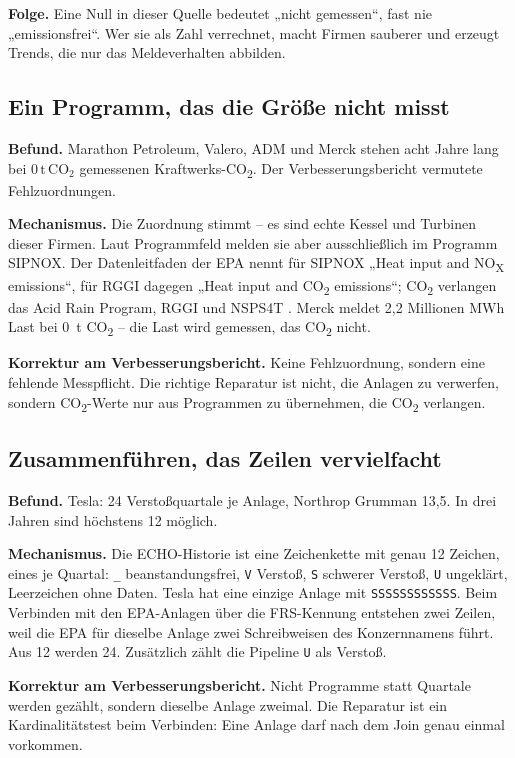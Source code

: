 \documentclass[11pt,a4paper]{article}
\newcommand{\tco}{\ensuremath{\mathrm{t\,CO}_{2}}}
\newcommand{\befund}[1]{%
  \par\vspace{2pt}\noindent\colorbox{softgrey}{%
  \begin{minipage}{\dimexpr\linewidth-2\fboxsep}\small\vspace{3pt}#1\vspace{3pt}\end{minipage}}\par\vspace{4pt}}
\begin{document}
\befund{\textbf{Folge.} Eine Null in dieser Quelle bedeutet „nicht gemessen“, fast nie „emissionsfrei“. Wer sie als Zahl verrechnet, macht Firmen sauberer und erzeugt Trends, die nur das Meldeverhalten abbilden.}

\subsection{Ein Programm, das die Größe nicht misst}

\textbf{Befund.} Marathon Petroleum, Valero, ADM und Merck stehen acht Jahre lang bei 0\,\tco{} gemessenen Kraftwerks-CO\textsubscript{2}. Der Verbesserungsbericht vermutete Fehlzuordnungen.

\textbf{Mechanismus.} Die Zuordnung stimmt -- es sind echte Kessel und Turbinen dieser Firmen. Laut Programmfeld melden sie aber ausschließlich im Programm SIPNOX. Der Datenleitfaden der EPA nennt für SIPNOX „Heat input and NO\textsubscript{X} emissions“, für RGGI dagegen „Heat input and CO\textsubscript{2} emissions“; CO\textsubscript{2} verlangen das Acid Rain Program, RGGI und NSPS4T \cite{camdguide}. Merck meldet 2{,}2 Millionen MWh Last bei 0~t CO\textsubscript{2} -- die Last wird gemessen, das CO\textsubscript{2} nicht.

\befund{\textbf{Korrektur am Verbesserungsbericht.} Keine Fehlzuordnung, sondern eine fehlende Messpflicht. Die richtige Reparatur ist nicht, die Anlagen zu verwerfen, sondern CO\textsubscript{2}-Werte nur aus Programmen zu übernehmen, die CO\textsubscript{2} verlangen.}

\subsection{Zusammenführen, das Zeilen vervielfacht}

\textbf{Befund.} Tesla: 24 Verstoßquartale je Anlage, Northrop Grumman 13{,}5. In drei Jahren sind höchstens 12 möglich.

\textbf{Mechanismus.} Die ECHO-Historie ist eine Zeichenkette mit genau 12 Zeichen, eines je Quartal: \texttt{\_} beanstandungsfrei, \texttt{V} Verstoß, \texttt{S} schwerer Verstoß, \texttt{U} ungeklärt, Leerzeichen ohne Daten. Tesla hat eine einzige Anlage mit \texttt{SSSSSSSSSSSS}. Beim Verbinden mit den EPA-Anlagen über die FRS-Kennung entstehen zwei Zeilen, weil die EPA für dieselbe Anlage zwei Schreibweisen des Konzernnamens führt. Aus 12 werden 24. Zusätzlich zählt die Pipeline \texttt{U} als Verstoß.

\befund{\textbf{Korrektur am Verbesserungsbericht.} Nicht Programme statt Quartale werden gezählt, sondern dieselbe Anlage zweimal. Die Reparatur ist ein Kardinalitätstest beim Verbinden: Eine Anlage darf nach dem Join genau einmal vorkommen.}
\end{document}
